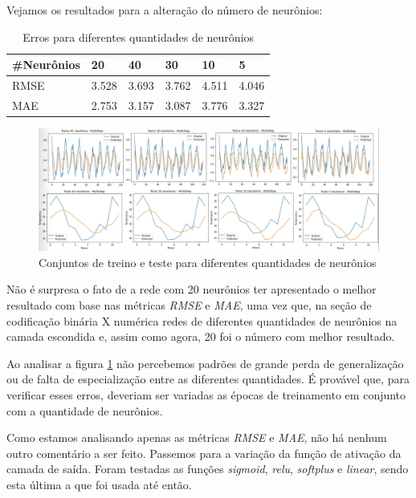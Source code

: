 \documentclass[12pt]{article}
\begin{document}
	Vejamos os resultados para a alteração do número de neurônios:
	\begin{table}[]
		\centering
		\begin{tabular}{|l|l|l|l|l|l|}
			\hline
			\#Neurônios & 20    & 40    & 30    & 10    & 5     \\ \hline
			RMSE        & 3.528 & 3.693 & 3.762 & 4.511 & 4.046 \\ \hline
			MAE         & 2.753 & 3.157 & 3.087 & 3.776 & 3.327 \\ \hline
		\end{tabular}
		\caption{Erros para diferentes quantidades de neurônios}
	\end{table}
	
	\begin{figure}[H]
		\centering
		\includegraphics[width=1.0\linewidth]{Imagens/topologias/numeroNeuronios}
		\caption{Conjuntos de treino e teste para diferentes quantidades de neurônios}
		\label{fig:inkednumeroneuroniosli}
	\end{figure}

	Não é surpresa o fato de a rede com 20 neurônios ter apresentado o melhor resultado com base nas métricas \textit{RMSE} e \textit{MAE}, uma vez que, na seção de codificação binária X numérica redes de diferentes quantidades de neurônios na camada escondida e, assim como agora, 20 foi o número com melhor resultado. 
	
	Ao analisar a figura \ref{fig:inkednumeroneuroniosli} não percebemos padrões de grande perda de generalização ou de falta de especialização entre as diferentes quantidades. É provável que, para verificar esses erros, deveriam ser variadas as épocas de treinamento em conjunto com a quantidade de neurônios.
	
	Como estamos analisando apenas as métricas \textit{RMSE} e \textit{MAE}, não há nenhum outro comentário a ser feito. Passemos para a variação da função de ativação da camada de saída. Foram testadas as funções \textit{sigmoid}, \textit{relu}, \textit{softplus} e \textit{linear}, sendo esta última a que foi usada até então.
	
\end{document}
